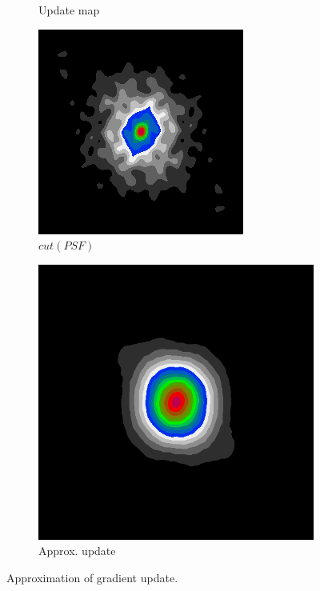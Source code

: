 \begin{figure}[h]
\begin{subfigure}[b]{0.245\linewidth}
		\caption{Update map}
	\end{subfigure}
	\begin{subfigure}[b]{0.245\linewidth}
		\includegraphics[width=\linewidth]{./chapters/03.distribution/simulated/psf.png}
		\caption{$cut(PSF)$}
	\end{subfigure}
	\begin{subfigure}[b]{0.245\linewidth}
		\includegraphics[width=\linewidth]{./chapters/03.distribution/simulated/psf2.png}
		\caption{Approx. update}
	\end{subfigure}
	
	\caption{Approximation of gradient update.}
\end{figure} 

